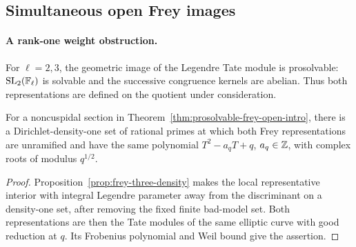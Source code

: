 \subsection{Simultaneous open Frey images}
\label{subsec:frey-open-images}
\paragraph{A rank-one weight obstruction.}

For $\ell=2,3$, the geometric image of the Legendre Tate module is
prosolvable: $\operatorname{SL}_2(\mathbb F_\ell)$ is solvable and the
successive congruence kernels are abelian. Thus both representations
are defined on the quotient under consideration.

\begin{lemma}\label{lem:frey-common-frobenius}
For a noncuspidal section in Theorem~\ref{thm:prosolvable-frey-open-intro},
there is a Dirichlet-density-one set of rational primes at which both
Frey representations are unramified and have the same polynomial
$T^2-a_qT+q$, $a_q\in\mathbb Z$, with complex roots of modulus $q^{1/2}$.
\end{lemma}
\begin{proof}
Proposition~\ref{prop:frey-three-density} makes the local representative
interior with integral Legendre parameter away from the discriminant
on a density-one set, after removing the fixed finite bad-model set.
Both representations are then the Tate modules of the same elliptic
curve with good reduction at $q$. Its Frobenius polynomial and Weil
bound give the assertion.
\end{proof}

